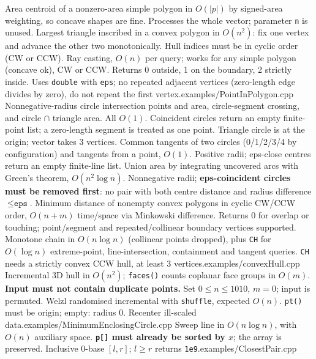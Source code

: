 {Area centroid of a nonzero-area simple polygon in $O(|p|)$ by signed-area weighting, so concave shapes are fine. Processes the whole vector; parameter \texttt{n} is unused.}
%
{Largest triangle inscribed in a convex polygon in $O(n^2)$: fix one vertex and advance the other two monotonically. Hull indices must be in cyclic order (CW or CCW).}
%
{Ray casting, $O(n)$ per query; works for any simple polygon (concave ok), CW or CCW. Returns 0 outside, 1 on the boundary, 2 strictly inside. Uses \texttt{double} with \texttt{eps}; no repeated adjacent vertices (zero-length edge divides by zero), do not repeat the first vertex.}{examples/PointInPolygon.cpp}
%
{Nonnegative-radius circle intersection points and area, circle-segment crossing, and circle $\cap$ triangle area. All $O(1)$. Coincident circles return an empty finite-point list; a zero-length segment is treated as one point. Triangle circle is at the origin; vector takes 3 vertices.}
%
{Common tangents of two circles (0/1/2/3/4 by configuration) and tangents from a point, $O(1)$. Positive radii; eps-close centres return an empty finite-line list.}
%
{Union area by integrating uncovered arcs with Green's theorem, $O(n^2\log n)$. Nonnegative radii; \textbf{eps-coincident circles must be removed first}: no pair with both centre distance and radius difference $\le\texttt{eps}$.}
%
{Minimum distance of nonempty convex polygons in cyclic CW/CCW order, $O(n+m)$ time/space via Minkowski difference. Returns 0 for overlap or touching; point/segment and repeated/collinear boundary vertices supported.}
%
{Monotone chain in $O(n\log n)$ (collinear points dropped), plus \texttt{CH} for $O(\log n)$ extreme-point, line-intersection, containment and tangent queries. \texttt{CH} needs a strictly convex CCW hull, at least 3 vertices.}{examples/convexHull.cpp}
%
{Incremental 3D hull in $O(n^2)$; \texttt{faces()} counts coplanar face groups in $O(m)$. \textbf{Input must not contain duplicate points.} Set $0\le n\le1010$, $m=0$; input is permuted.}
%
{Welzl randomised incremental with \texttt{shuffle}, expected $O(n)$. \texttt{pt()} must be origin; empty: radius 0. Recenter ill-scaled data.}{examples/MinimumEnclosingCircle.cpp}
%
{Sweep line in $O(n\log n)$, with $O(n)$ auxiliary space. \textbf{\texttt{p[]} must already be sorted by $x$}; the array is preserved. Inclusive 0-base $[l,r]$; $l\ge r$ returns \texttt{1e9}.}{examples/ClosestPair.cpp}

